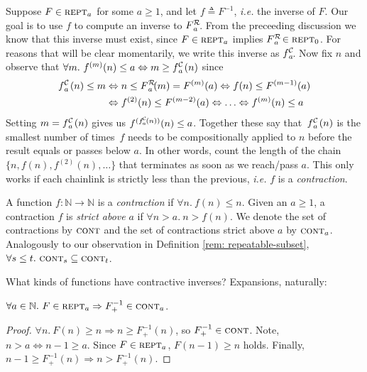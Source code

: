 Suppose $F \in \text{\scshape{rept}}_a$ for some $a \ge 1$, and
let $f \triangleq F^{-1}$, \emph{i.e.} the inverse of $F$.
Our goal is to use $f$ to compute an inverse to $\rf{F}{a}$.
From the preceeding discussion we know that this inverse must exist,
since $F \in \text{\scshape{rept}}_a$ implies $\rf{F}{a} \in \repeatable_0$.
For reasons that will be clear momentarily, we write this inverse as $\cdt{f}{a}$.  Now
fix $n$ and observe that $\forall m.~f^{(m)}(n)\le a \iff m \ge \cdt{f}{a}(n)$
since
\vspace{-0.5em}
\begin{equation} \label{eq: rf-upp-inv}
\begin{aligned}
\cdt{f}{a}(n)\le m & \iff n\le \rf{F}{a}(m) = F^{(m)}(a) \iff f(n)\le F^{(m-1)}(a) \\
& \iff f^{(2)}(n)\le F^{(m-2)}(a) \iff \ldots \iff f^{(m)}(n)\le a
\end{aligned}
\vspace{-0.5em}
\end{equation}
Setting $m = \cdt{f}{a}(n)$ gives us
$f^{(\cdt{f}{a}(n))}(n) \le a$.
Together these say that~$\cdt{f}{a}(n)$ is the smallest number of
times~$f$ needs to be compositionally applied to $n$ before the result
equals or passes below $a$.
In other words, count the length of the chain $\{n, f(n), f^{(2)}(n), \ldots\}$ that
terminates as soon as we reach/pass $a$.
This only works if each chainlink is strictly less than the previous,
\emph{i.e.} $f$ is a \emph{contraction}.
\begin{defn} \label{defn: contracting}
	A function $f : \mathbb{N} \to \mathbb{N}$ is a \emph{contraction} if $\forall n.~ f(n) \le n$. Given an $a \ge 1$, a contraction $f$ is
	\emph{strict above} $a$ if $\forall n > a.~n > f(n)$. We denote the set of contractions by $\text{\scshape{cont}}$ and the set of contractions strict above $a$ by $\text{\scshape{cont}}_a$. Analogously to our observation in
	Definition \ref{rem: repeatable-subset}, $\forall s\le t.~ \text{\scshape{cont}}_s \subseteq \text{\scshape{cont}}_t$.
\end{defn}
What kinds of functions have contractive inverses? Expansions, naturally:
\begin{thm} \label{thm: expansion-inv-contraction}
$\forall a\in \mathbb{N}.~F\in \text{\scshape{rept}}_a \Rightarrow F^{-1}_+ \in \text{\scshape{cont}}_a$.
\end{thm}
\begin{proof}
$\forall n.~F(n)\ge n \Rightarrow n \ge F^{-1}_+(n)$, so $F^{-1}_+ \in
\text{\scshape{cont}}$. Note, $n > a \iff n-1\ge a$.
Since $F\in \text{\scshape{rept}}_a$, $F(n-1)\ge n$ holds.
Finally, $n-1\ge F^{-1}_+(n) \Rightarrow n > F^{-1}_+(n)$.
\end{proof}
